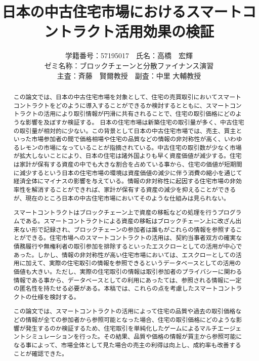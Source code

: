 \documentclass[a4paper,fontsize=11pt,report,notitlepage,line_length=38zw,number_of_lines=40]{jlreq}
\title{日本の中古住宅市場におけるスマートコントラクト活用効果の検証}
\author{
学籍番号：57195017　氏名：高橋　宏輝
\\ゼミ名称：ブロックチェーンと分散ファイナンス演習
\\主査：斉藤　賢爾教授　副査：中里 大輔教授}
\begin{document}
\date{}
\maketitle
\begin{abstract}
この論文では、日本の中古住宅市場を対象として、住宅の売買取引においてスマートコントラクトをどのように導入することができるか検討するとともに、スマートコントラクトの活用により取引情報が円滑に共有されることで、住宅の取引価格にどのような影響を及ぼすか検証する。
日本の住宅市場は新築住宅の取引量が多く、中古住宅の取引量が相対的に少ない。この背景として日本の中古住宅市場では、売主、買主といった市場参加者の間で価格相場や住宅の品質などの情報の非対称性が高く、いわゆるレモンの市場になっていることが指摘されている。中古住宅の取引数が少なく市場が拡大しないことにより、日本の住宅は諸外国よりも早く資産価値が減少する。住宅は家計が保有する資産の中でも大きな割合を占めている事から、住宅の価値が短期間に減少するという日本の住宅市場の環境は資産価値の減少に伴う消費の縮小を通じて経済全体にマイナスの影響を与えている。情報の非対称性に起因する住宅市場の非効率性を解消することができれば、家計が保有する資産の減少を抑えることができるが、現在のところ日本の中古住宅市場においてそのような仕組みは見られない。

スマートコントラクトはブロックチェーン上で資産の移転などの処理を行うプログラムである。スマートコントラクトによる資産の移転はブロックチェーン上に改ざん出来ない形で記録され、ブロックチェーンの参加者は誰もがこれらの情報を参照することができる。住宅市場へのスマートコントラクトの活用は、契約当事者双方の確実な債務履行や無権利者の取引参加を排除するといったエスクローとしての活用が中心であった。しかし、情報の非対称性が高い住宅市場においては、エスクローとしての活用に加えて、実際の住宅取引の情報を参照できるというデータベースとしての活用の価値も大きい。ただし、実際の住宅取引の情報は取引参加者のプライバシーに関わる情報である事から、データベースとしての利用にあったては、参照される情報に一定の匿名性を持たせる必要がある。本稿では、これらの点を考慮したスマートコントラクトの仕様を検討する。

この論文では、スマートコントラクトの活用によって住宅の品質や過去の取引価格などの情報が全ての参加者から参照可能となった場合、住宅の取引価格にどのような影響が発生するのか検証するため、住宅取引を単純化したゲームによるマルチエージェントシミュレーションを行った。その結果、品質や価格の情報が買主から参照可能になる事によって、市場全体として見た場合の売主の利得は向上し、成約率も改善することが確認できた。
\end{abstract}

\newpage
\tableofcontents
\end{document}
